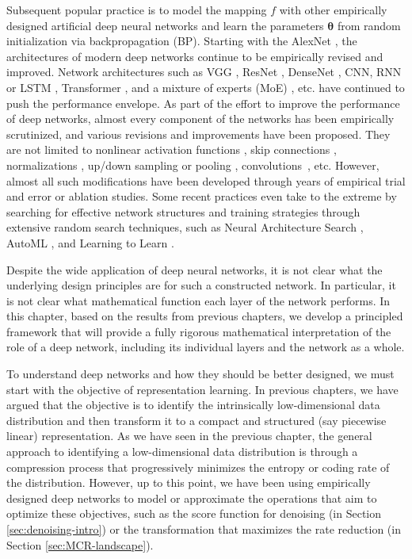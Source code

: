 \documentclass[../../book-main.tex]{subfiles}
\begin{document}
Subsequent popular practice is to model the mapping $f$ with other empirically designed artificial deep neural networks and learn the parameters $\bm \theta$ from random initialization via backpropagation (BP). Starting with the AlexNet \cite{krizhevsky2012imagenet}, the architectures of modern deep networks continue to be empirically revised and improved. Network architectures such as VGG \cite{simonyan2014very}, ResNet \cite{he2016deep}, DenseNet \cite{dense-net}, CNN, RNN or LSTM \cite{LSTM}, Transformer \cite{vaswani2017attention}, and a mixture of experts (MoE) \cite{MoE,Fedus-2022}, etc. have continued to push the performance envelope. As part of the effort to improve the performance of deep networks, almost every component of the networks has been empirically scrutinized, and various revisions and improvements have been proposed. They are not limited to nonlinear activation functions \cite{maas2013rectifier,klambauer2017self,xu2015empirical,nwankpa2018activation}, skip connections \cite{ronneberger2015u,he2016deep}, normalizations \cite{ioffe2015batch,ba2016layer,ulyanov2016instance,wu2018group,miyato2018spectral}, up/down sampling or pooling \cite{scherer2010evaluation}, convolutions~\cite{lecun1998gradient,krizhevsky2012imagenet}, etc.
However, almost all such modifications have been developed through years of empirical {trial and error} or ablation studies. Some recent practices even take to the extreme by searching for effective network structures and training strategies through extensive random search techniques, such as Neural Architecture Search \cite{NAS-1,Baker2017DesigningNN}, AutoML \cite{automl}, and Learning to Learn \cite{andrychowicz2016learning}. 

Despite the wide application of deep neural networks, it is not clear what the underlying design principles are for such a constructed network. In particular, it is not clear what mathematical function each layer of the network performs. In this chapter, based on the results from previous chapters, we develop a principled framework that will provide a fully rigorous mathematical interpretation of the role of a deep network, including its individual layers and the network as a whole. 

To understand deep networks and how they should be better designed, we must start with the objective of representation learning. In previous chapters, we have argued that the objective is to identify the intrinsically low-dimensional data distribution and then transform it to a compact and structured (say piecewise linear) representation. As we have seen in the previous chapter, the general approach to identifying a low-dimensional data distribution is through a compression process that progressively minimizes the entropy or coding rate of the distribution. However, up to this point, we have been using empirically designed deep networks to model or approximate the operations that aim to optimize these objectives, such as the score function for denoising (in Section \ref{sec:denoising-intro}) or the transformation that maximizes the rate reduction (in Section \ref{sec:MCR-landscape}). 
\end{document}
